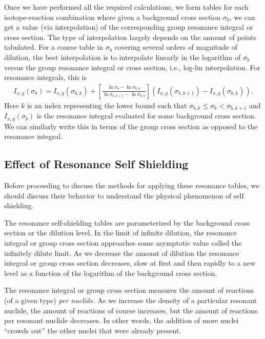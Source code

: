 Once we have performed all the required calculations, we form tables for each isotope-reaction combination where given a background cross section $\sigma_b$, we can get a value (via interpolation) of the corresponding group resonance integral or cross section. The type of interpolation largely depends on the amount of points tabulated. For a course table in $\sigma_b$ covering several orders of magnitude of dilution, the best interpolation is to interpolate linearly in the logarithm of $\sigma_b$ versus the group resonance integral or cross section, i.e., log-lin interpolation. For resonance integrals, this is
\begin{align}
  I_{x,g}( \sigma_b ) = I_{x,g}( \sigma_{b,k} ) + \left[ \frac{ \ln\sigma_b - \ln\sigma_{b,k} }{ \ln\sigma_{b,k+1} - \ln\sigma_{b,k} }  \right] \left( I_{x,g}( \sigma_{b,k+1} ) - I_{x,g}( \sigma_{b,k} )  \right) .
\end{align}
Here $k$ is an index representing the lower bound such that $\sigma_{b,k} \le \sigma_b < \sigma_{b,k+1}$ and $I_{x,g}( \sigma_b )$ is the resonance integral evaluated for some background cross section. We can similarly write this in terms of the group cross section as opposed to the resonance integral.

\subsection{Effect of Resonance Self Shielding}

Before proceeding to discuss the methods for applying these resonance tables, we should discuss their behavior to understand the physical phenomenon of self shielding. 

The resonance self-shielding tables are parameterized by the background cross section or the dilution level. In the limit of infinite dilution, the resonance integral or group cross section approaches some asymptotic value called the infinitely dilute limit. As we decrease the amount of dilution the resonance integral or group cross section decreases, slow at first and then rapidly to a new level as a function of the logarithm of the background cross section.

The resonance integral or group cross section measures the amount of reactions (of a given type) \emph{per nuclide}. As we increase the density of a particular resonant nuclide, the amount of reactions of course increases, but the amount of reactions per resonant nuclide decreases. In other words, the addition of more nuclei ``crowds out'' the other nuclei that were already present.

